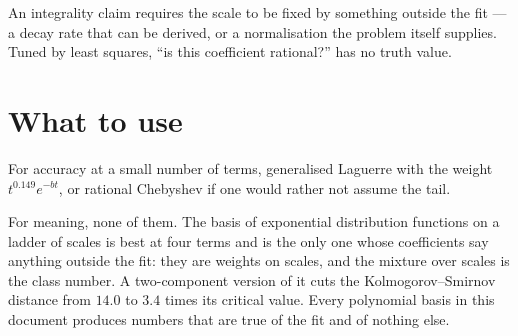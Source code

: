 \documentclass[12pt,a4paper]{article}
\begin{document}
\begin{tcolorbox}[colback=blue!6, colframe=blue!45!black, arc=2mm]
An integrality claim requires the scale to be fixed by something outside the fit --- a decay rate that can be derived, or a normalisation the problem itself supplies. Tuned by least squares, ``is this coefficient rational?'' has no truth value.
\end{tcolorbox}

\section{What to use}

For accuracy at a small number of terms, generalised Laguerre with the weight $t^{0.149}e^{-bt}$, or rational Chebyshev if one would rather not assume the tail.

For meaning, none of them. The basis of exponential distribution functions on a ladder of scales is best at four terms and is the only one whose coefficients say anything outside the fit: they are weights on scales, and the mixture over scales is the class number. A two-component version of it cuts the Kolmogorov--Smirnov distance from $14.0$ to $3.4$ times its critical value. Every polynomial basis in this document produces numbers that are true of the fit and of nothing else.
\end{document}
